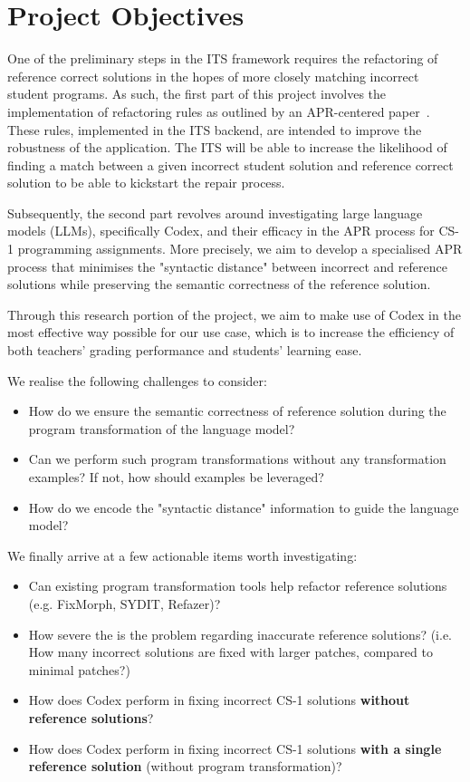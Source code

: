 \section{Project Objectives}\label{sec:project-objectives}

One of the preliminary steps in the ITS framework requires the refactoring of reference correct
solutions in the hopes of more closely matching incorrect student programs.
As such, the first part of this project involves the implementation of refactoring rules as
outlined by an APR-centered paper~\cite{hu2019re}.
These rules, implemented in the ITS backend, are intended to improve the robustness of the
application.
The ITS will be able to increase the likelihood of finding a match between a given incorrect
student solution and reference correct solution to be able to kickstart the repair process.

Subsequently, the second part revolves around investigating large language models (LLMs),
specifically Codex, and their efficacy in the APR process for CS-1 programming assignments.
More precisely, we aim to develop a specialised APR process that minimises the "syntactic
distance" between incorrect and reference solutions while preserving the semantic
correctness of the reference solution.

Through this research portion of the project, we aim to make use of Codex in the most
effective way possible for our use case, which is to increase the efficiency of both
teachers' grading performance and students' learning ease.

We realise the following challenges to consider:
\begin{itemize}
    \item How do we ensure the semantic correctness of reference solution during the program
          transformation of the language model?
    \item Can we perform such program transformations without any transformation examples?
          If not, how should examples be leveraged?
    \item How do we encode the "syntactic distance" information to guide the language model?
\end{itemize}

We finally arrive at a few actionable items worth investigating:
\begin{itemize}
    \item Can existing program transformation tools help refactor reference solutions
          (e.g. FixMorph, SYDIT, Refazer)?
    \item How severe the is the problem regarding inaccurate reference solutions?
          (i.e. How many incorrect solutions are fixed with larger patches, compared
           to minimal patches?)
    \item How does Codex perform in fixing incorrect CS-1 solutions \textbf{without reference solutions}?
    \item How does Codex perform in fixing incorrect CS-1 solutions \textbf{with a single reference
          solution} (without program transformation)?
\end{itemize}

